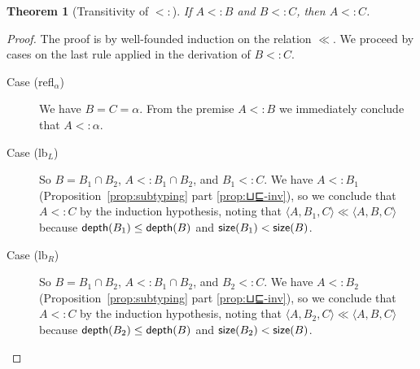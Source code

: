 \documentclass{article}
\newtheorem{theorem}{Theorem}
\begin{document}
\begin{theorem}[Transitivity of $<:$]\label{thm:⊑-trans}
    If $A <: B$ and $B <: C$, then $A <: C$.
\end{theorem}
\begin{proof}
  The proof is by well-founded induction on the relation $\ll$.
  We proceed by cases on the last rule applied in the
  derivation of $B <: C$.
  \begin{description}
  \item[Case (refl$_\alpha$)] We have $B = C = \alpha$.  From the premise $A <:
    B$ we immediately conclude that $A <: \alpha$.
  \item[Case (lb$_L$)] So $B = B_1 \cap B_2$, $A <: B_1 \cap
    B_2$, and $B_1 <: C$.
    We have $A <: B_1$ (Proposition~\ref{prop:subtyping} part
    \ref{prop:⊔⊑-inv}), so we conclude that $A <: C$ by the induction
    hypothesis, noting that $\langle A, B_1, C \rangle \ll \langle A,
    B, C \rangle$
    because $\mathsf{depth}(B_1) \le \mathsf{depth}(B)$
    and $\mathsf{size}(B_1) < \mathsf{size}(B)$.
  \item[Case (lb$_R$)] So $B = B_1 \cap B_2$, $A <:
    B_1 \cap B_2$, and $B_2 <: C$.  We have $A <: B_2$
    (Proposition~\ref{prop:subtyping} part \ref{prop:⊔⊑-inv}), so we
    conclude that $A <: C$ by the induction hypothesis, noting that
    $\langle A, B_2, C \rangle \ll \langle A, B, C \rangle$ because
    $\mathsf{depth}(B_2) \leq \mathsf{depth}(B)$ and $\mathsf{size}(B_2) < \mathsf{size}(B)$.
    

\end{description}
\end{proof}
\end{document}
